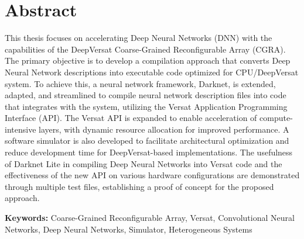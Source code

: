 
\section*{Abstract}



This thesis focuses on accelerating Deep Neural Networks (DNN) with the capabilities of the DeepVersat Coarse-Grained Reconfigurable Array (CGRA). The primary objective is to develop a compilation approach that converts Deep Neural Network descriptions into executable code optimized for CPU/DeepVersat system. To achieve this, a neural network framework, Darknet, is extended, adapted, and streamlined to compile neural network description files into code that integrates with the system, utilizing the Versat Application Programming Interface (API). The Versat API is expanded to enable acceleration of compute-intensive layers, with dynamic resource allocation for improved performance. A software simulator is also developed to facilitate architectural optimization and reduce development time for DeepVersat-based implementations.
The usefulness of Darknet Lite in compiling Deep Neural Networks into Versat code and the effectiveness of the new API on various hardware configurations are demonstrated through multiple test files, establishing a proof of concept for the proposed approach.

\vfill

\textbf{\Large Keywords:} Coarse-Grained Reconfigurable Array, Versat, Convolutional Neural Networks, Deep Neural Networks, Simulator, Heterogeneous Systems
